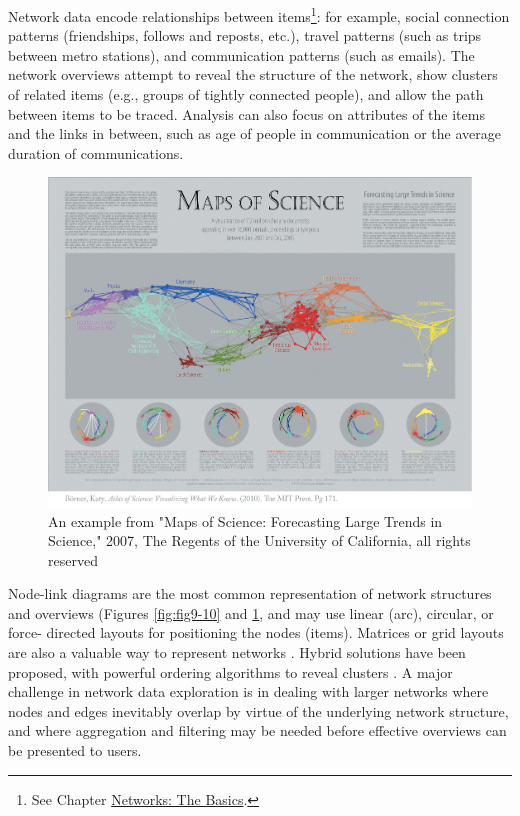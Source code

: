 \documentclass[]{krantz}
\begin{document}
Network data encode relationships between items\footnote{See Chapter
  \protect\hyperlink{chap:networks}{Networks: The Basics}.}: for
example, social connection patterns (friendships, follows and reposts,
etc.), travel patterns (such as trips between metro stations), and
communication patterns (such as emails). The network overviews attempt
to reveal the structure of the network, show clusters of related items
(e.g., groups of tightly connected people), and allow the path between
items to be traced. Analysis can also focus on attributes of the items
and the links in between, such as age of people in communication or the
average duration of communications.

\begin{figure}

{\centering \includegraphics[width=0.9\linewidth]{ChapterViz/figures/fig9-10b} 

}

\caption{An example from "Maps of Science: Forecasting Large Trends in Science," 2007, The Regents of the University of California, all rights reserved \citep{borner2010atlas}}\label{fig:fig9-10b}
\end{figure}

Node-link diagrams are the most common representation of network
structures and overviews (Figures \ref{fig:fig9-10} and
\ref{fig:fig9-10b}, and may use linear (arc), circular, or force-
directed layouts for positioning the nodes (items). Matrices or grid
layouts are also a valuable way to represent networks
\citep{henry2006matrixexplorer}. Hybrid solutions have been proposed,
with powerful ordering algorithms to reveal clusters
\citep{hansen2010analyzing}. A major challenge in network data
exploration is in dealing with larger networks where nodes and edges
inevitably overlap by virtue of the underlying network structure, and
where aggregation and filtering may be needed before effective overviews
can be presented to users.
\end{document}
